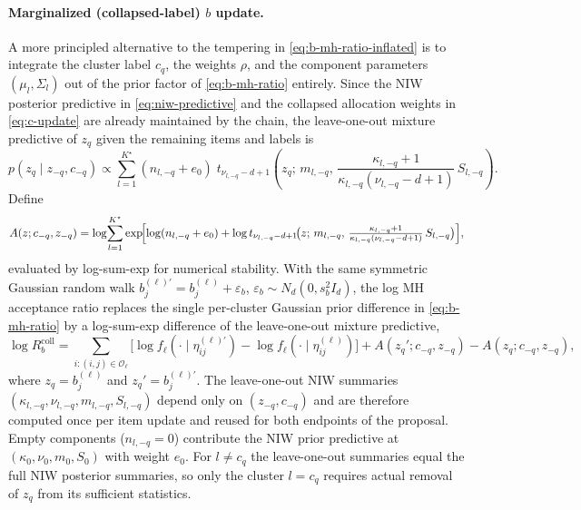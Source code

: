 \documentclass[11pt]{article}
\begin{document}
\paragraph{Marginalized (collapsed-label) $b$ update.}
A more principled alternative to the tempering in
\eqref{eq:b-mh-ratio-inflated} is to integrate the cluster label $c_q$, the
weights $\rho$, and the component parameters $(\mu_l,\Sigma_l)$ out of the
prior factor of \eqref{eq:b-mh-ratio} entirely.  Since the NIW posterior
predictive in \eqref{eq:niw-predictive} and the collapsed allocation weights
in \eqref{eq:c-update} are already maintained by the chain, the leave-one-out
mixture predictive of $z_q$ given the remaining items and labels is
\begin{equation}
    p(z_q\mid z_{-q},c_{-q})
    \propto
    \sum_{l=1}^{K^\star}
    (n_{l,-q}+e_0)\;
    t_{\nu_{l,-q}-d+1}\!\left(
    z_q;\,m_{l,-q},\,
    \frac{\kappa_{l,-q}+1}{\kappa_{l,-q}(\nu_{l,-q}-d+1)}\,S_{l,-q}
    \right).
    \label{eq:b-marginal-prior}
\end{equation}
Define
\begin{equation}
    A(z;c_{-q},z_{-q})
    =
    \log\!\sum_{l=1}^{K^\star}
    \exp\!\Bigl[
        \log(n_{l,-q}+e_0)
        +\log t_{\nu_{l,-q}-d+1}\!\bigl(
            z;\,m_{l,-q},\,
            \tfrac{\kappa_{l,-q}+1}{\kappa_{l,-q}(\nu_{l,-q}-d+1)}\,S_{l,-q}
        \bigr)
    \Bigr],
    \label{eq:b-marginal-A}
\end{equation}
evaluated by log-sum-exp for numerical stability.  With the same symmetric
Gaussian random walk $b_j^{(\ell)\prime}=b_j^{(\ell)}+\varepsilon_b$,
$\varepsilon_b\sim N_d(0,s_b^2 I_d)$, the log MH acceptance ratio replaces
the single per-cluster Gaussian prior difference in \eqref{eq:b-mh-ratio} by
a log-sum-exp difference of the leave-one-out mixture predictive,
\begin{equation}
    \log R_b^{\mathrm{coll}}
    =
    \sum_{i:(i,j)\in\mathcal O_\ell}
    \!\bigl[\log f_\ell(\cdot\mid \eta_{ij}^{(\ell)\prime})
        - \log f_\ell(\cdot\mid \eta_{ij}^{(\ell)})\bigr]
    +
    A(z_q';c_{-q},z_{-q})
    -
    A(z_q;c_{-q},z_{-q}),
    \label{eq:b-mh-ratio-marginal}
\end{equation}
where $z_q=b_j^{(\ell)}$ and $z_q'=b_j^{(\ell)\prime}$.  The leave-one-out
NIW summaries $(\kappa_{l,-q},\nu_{l,-q},m_{l,-q},S_{l,-q})$ depend only on
$(z_{-q},c_{-q})$ and are therefore computed once per item update and
reused for both endpoints of the proposal.  Empty components ($n_{l,-q}=0$)
contribute the NIW prior predictive at $(\kappa_0,\nu_0,m_0,S_0)$ with
weight $e_0$.  For $l\neq c_q$ the leave-one-out summaries equal the full
NIW posterior summaries, so only the cluster $l=c_q$ requires actual
removal of $z_q$ from its sufficient statistics.
\end{document}
